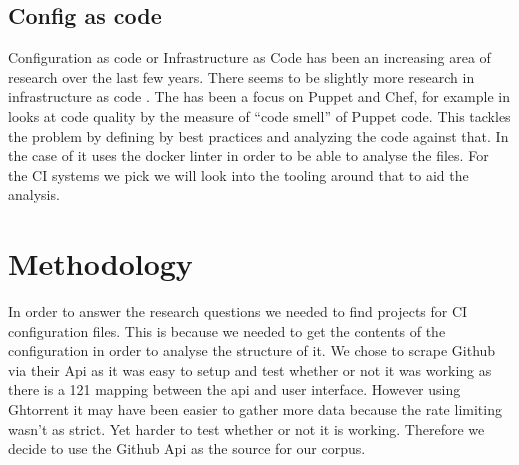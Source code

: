 \documentclass[twoside,12pt,titlepage,a4paper]{article}
\begin{document}
\vspace*{-0.05in}
\subsection{Config as code}
\vspace*{-0.05in}

Configuration as code or Infrastructure as Code has been an increasing area of research over the last few years. There seems to be slightly more research in infrastructure as code \citet{Rahman2019}. The has been a focus on Puppet and Chef, for example in \citet{Sharma2016} looks at code quality by the measure of \enquote{code smell} of Puppet code. This tackles the problem by defining by best practices and analyzing the code against that. In the case of \citet{Cito2017} it uses the docker linter in order to be able to analyse the files. 
For the CI systems we pick we will look into the tooling around that to aid the analysis.


\section{Methodology}
\label{methodology}
In order to answer the research questions we needed to find projects for CI configuration files. This is because we needed to get the contents of the configuration in order to analyse the structure of it. We chose to scrape Github via their Api as it was easy to setup and test whether or not it was working as there is a 121 mapping between the api and user interface. However using Ghtorrent \citet{GhTorrent2020} it may have been easier to gather more data because the rate limiting wasn't as strict. Yet harder to test whether or not it is working. Therefore we decide to use the Github Api as the source for our corpus.
\end{document}
